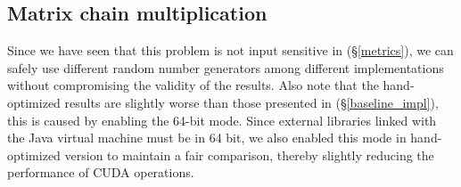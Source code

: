 \def\hh{\normalsize\bf}
\def\hl#1#2{\begin{minipage}{3.5cm} {\bf #1} \\[-2pt] \footnotesize #2 \vspace{6pt} \end{minipage}}
\def\hdps{\hl{DynaProg}{Scala parsers}}
\def\hdpc{\hl{DynaProg}{CUDA parsers}}
\def\hhoc{\hl{Optimized}{C, single thread}}
\def\hhog{\hl{Optimized}{CUDA, 64-bit}}
\def\hgapc{\hl{GAPC}{\cite{gapc_thesis}, C, single thread}}
\def\hatlp{\hl{ATLP}{\cite{gpu_atlp}, rescaled results$^{(1)}$}}
\def\hcua{\hl{CUDAlign}{\cite{swat_linear}, version 2.0}}
\def\hvien{\hl{ViennaRNA}{\cite{vienna_rna}}}
\def\hrna{\hl{RNAFold}{\cite{gpu_rnafold}}}

\subsection{Matrix chain multiplication}
Since we have seen that this problem is not input sensitive in (\S\ref{metrics}), we can safely use different random number generators among different implementations without compromising the validity of the results.  Also note that the hand-optimized results are slightly worse than those presented in (\S\ref{baseline_impl}), this is caused by enabling the 64-bit mode. Since external libraries linked with the Java virtual machine must be in 64 bit, we also enabled this mode in hand-optimized version to maintain a fair comparison, thereby slightly reducing the performance of CUDA operations.


